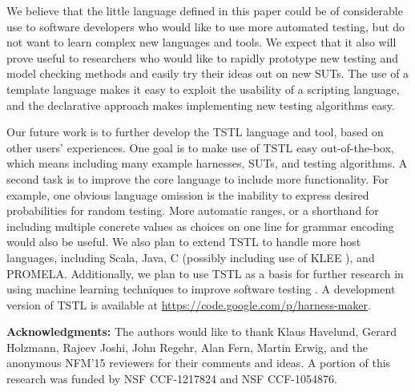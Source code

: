 \documentclass[runningheads,a4paper]{llncs}
\begin{document}
We believe that the little language defined in this paper could be of
considerable use to software developers who would like to use more
automated testing, but do not want to learn complex new languages and
tools.  We expect that it also will prove useful to researchers who
would like to rapidly prototype new testing and model checking methods
and easily try their ideas out on new SUTs.  The use of a template
language makes it easy to exploit the usability of a scripting
language, and the declarative approach makes implementing new
testing algorithms easy.

Our future work is to further develop the TSTL language and tool,
based on other users' experiences.  One goal is to make use of TSTL
easy out-of-the-box, which means including many example harnesses,
SUTs, and testing algorithms.  A second task is to improve the core
language to include more functionality.  For example, one obvious
language omission is the inability to express desired probabilities
for random testing.  More automatic ranges, or a shorthand for
including multiple concrete values as choices on one line for grammar
encoding would also be useful.  We also plan to extend TSTL to handle
more host languages, including Scala, Java, C (possibly including use
of KLEE \cite{KLEE}), and PROMELA.  Additionally, we plan to use TSTL
as a basis for further research in using machine learning techniques
to improve software testing \cite{ISOLA12}.  A development version of
TSTL is available at \url{https://code.google.com/p/harness-maker}.

{\bf Acknowledgments:} The authors would like to thank Klaus Havelund,
Gerard Holzmann, Rajeev Joshi, John Regehr, Alan Fern, Martin Erwig,
and the anonymous NFM'15 reviewers for their comments and ideas.  A
portion of this research was funded by NSF CCF-1217824 and NSF
CCF-1054876.




\end{document}
